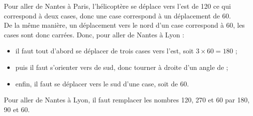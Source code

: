 \begin{corrige}
   Pour aller de Nantes à Paris, l'hélicoptère se déplace vers l'est de 120 ce qui correspond à deux cases, donc une case correspond à un déplacement de 60. \\
   De la même manière, un déplacement vers le nord d'un case correspond à 60, les cases sont donc carrées. Donc, pour aller de Nantes à Lyon :
   \begin{itemize}
      \item il faut tout d'abord se déplacer de trois cases vers l'est, soit $3\times60 =180$ ;
      \item  puis il faut s'orienter vers de sud, donc tourner à droite d'un angle de  ;
      \item enfin, il faut se déplacer vers le sud d'une case, soit de 60.
   \end{itemize}
   Pour aller de Nantes à Lyon, {\blue il faut remplacer les nombres 120, 270 et 60 par 180, 90 et 60}.
\end{corrige}

\bigskip


